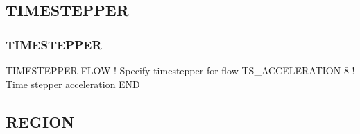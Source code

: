\documentclass{beamer}
\newcommand\bluecomment[1]{{{\color{blue} #1}}}
\begin{document}
\subsection{TIMESTEPPER}
\begin{frame}\frametitle{TIMESTEPPER}

\begin{semiverbatim}
TIMESTEPPER FLOW        \bluecomment{! Specify timestepper for flow}
  TS_ACCELERATION 8     \bluecomment{! Time stepper acceleration}
END
\end{semiverbatim}
\end{frame}

\subsection{REGION}
\end{document}

